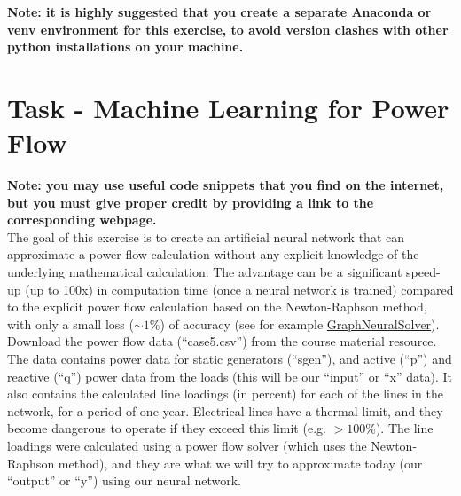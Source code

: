 \documentclass[11pt]{article}
\begin{document}
\textbf{Note: it is highly suggested that you create a separate Anaconda or venv environment
  for this exercise, to avoid version clashes with other python installations on your machine.}\\

\section{Task - Machine Learning for Power Flow}
\label{ml_pf}

{\color{red}\textbf{Note: you may use useful code snippets that you find on the internet,
    but you must give proper credit by providing a link to the corresponding webpage.}}\\

The goal of this exercise is to create an artificial neural network that can approximate a power
flow calculation without any explicit knowledge of the underlying mathematical calculation. The
advantage can be a significant speed-up (up to 100x) in computation time (once a neural network is trained)
compared to the explicit power flow calculation based on the Newton-Raphson method, with
only a small loss ($\sim1$\%) of accuracy
(see for example \href{https://hal.archives-ouvertes.fr/hal-02372741/file/PSCC2020_NeuralNetworksForPowerFlows_GraphNeuralSolver__Copy_-2.pdf}{GraphNeuralSolver}).\\

Download the power flow data (``case5.csv'') from the course material resource. The data contains power data for
static generators (``sgen''), and active (``p'') and reactive (``q'') power data from the loads (this will be
our ``input'' or ``x'' data).
It also contains the calculated line loadings (in percent) for each of the lines in the network, for a period
of one year. Electrical lines have a thermal limit, and they become dangerous to operate if they exceed
this limit (e.g. $>100$\%).
The line loadings were calculated using a power flow solver (which uses the Newton-Raphson
method), and they are what we will try to approximate today (our ``output'' or ``y'') using our neural network.\\
\end{document}
